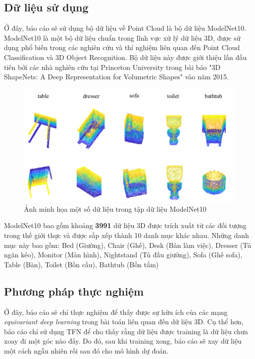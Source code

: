 \subsection{Dữ liệu sử dụng}
Ở đây, báo cáo sẽ sử dụng bộ dữ liệu về Point Cloud là bộ dữ liệu ModelNet10\cite{data_modelnet10}. ModelNet10 là một bộ dữ liệu chuẩn trong lĩnh vực xử lý dữ liệu 3D, được sử dụng phổ biến trong các nghiên cứu và thí nghiệm liên quan đến Point Cloud Classification và 3D Object Recognition. Bộ dữ liệu này được giới thiệu lần đầu tiên bởi các nhà nghiên cứu tại Princeton University trong bài báo "3D ShapeNets: A Deep Representation for Volumetric Shapes"\cite{data_modelnet10} vào năm 2015.

\begin{figure}[H]
    \centering
    \includegraphics[width=0.8\linewidth]{Images/TFN/data_img.png}
    \caption{Ảnh minh họa một số dữ liệu trong tập dữ liệu ModelNet10}
\end{figure}

ModelNet10 bao gồm khoảng \textbf{3991} dữ liệu 3D được trích xuất từ các đối tượng trong thế giới thực và được sắp xếp thành 10 danh mục khác nhau. Những danh mục này bao gồm: Bed (Giường), Chair (Ghế), Desk (Bàn làm việc), Dresser (Tủ ngăn kéo), Monitor (Màn hình), Nightstand (Tủ đầu giường), Sofa (Ghế sofa), Table (Bàn), Toilet (Bồn cầu), Bathtub (Bồn tắm)

\subsection{Phương pháp thực nghiệm}
Ở đây, báo cáo sẽ chỉ thực nghiệm để thấy được sự hữu ích của các mạng \textit{equivariant deep learning} trong bài toán liên quan đến dữ liệu 3D. Cụ thể hơn, báo cáo chỉ sử dụng TFN để cho thấy rằng dữ liệu được training là dữ liệu chưa xoay đi một góc nào đấy. Do đó, sau khi training xong, báo cáo sẽ xay dữ liệu một cách ngẫu nhiên rồi sau đó cho mô hình dự đoán.

